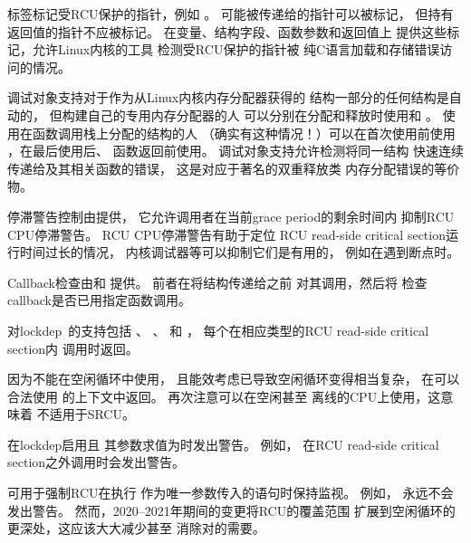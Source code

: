 标签标记受RCU保护的指针，例如
。
可能被传递给的指针可以被标记，
但持有返回值的指针不应被标记。
在变量、结构字段、函数参数和返回值上
提供这些标记，允许Linux内核的工具
检测受RCU保护的指针被
纯C语言加载和存储错误访问的情况。

调试对象支持对于作为从Linux内核内存分配器获得的
结构一部分的任何结构是自动的，
但构建自己的专用内存分配器的人
可以分别在分配和释放时使用和
。
使用在函数调用栈上分配的结构的人
（确实有这种情况！）可以在首次使用前使用
，在最后使用后、
函数返回前使用。
调试对象支持允许检测将同一结构
快速连续传递给及其相关函数的错误，
这是对应于著名的双重释放类
内存分配错误的等价物。

停滞警告控制由提供，
它允许调用者在当前grace period的剩余时间内
抑制RCU CPU停滞警告。
RCU CPU停滞警告有助于定位
RCU read-side critical section运行时间过长的情况，
内核调试器等可以抑制它们是有用的，
例如在遇到断点时。

Callback检查由和
提供。
前者在将结构传递给之前
对其调用，然后将
检查callback是否已用指定函数调用。

对lockdep~\cite{JonathanCorbet2006lockdep}的支持包括
、
、
和
，
每个在相应类型的RCU read-side critical section内
调用时返回。

\QuickQuizEnd

因为不能在空闲循环中使用，
且能效考虑已导致空闲循环变得相当复杂，
在可以合法使用
的上下文中返回。
再次注意可以在空闲甚至
离线的CPU上使用，这意味着
不适用于SRCU。

在lockdep启用且
其参数求值为时发出警告。
例如，
在RCU read-side critical section之外调用时会发出警告。

可用于强制RCU在执行
作为唯一参数传入的语句时保持监视。
例如，
永远不会发出警告。
然而，2020--2021年期间的变更将RCU的覆盖范围
扩展到空闲循环的更深处，这应该大大减少甚至
消除对的需要。

